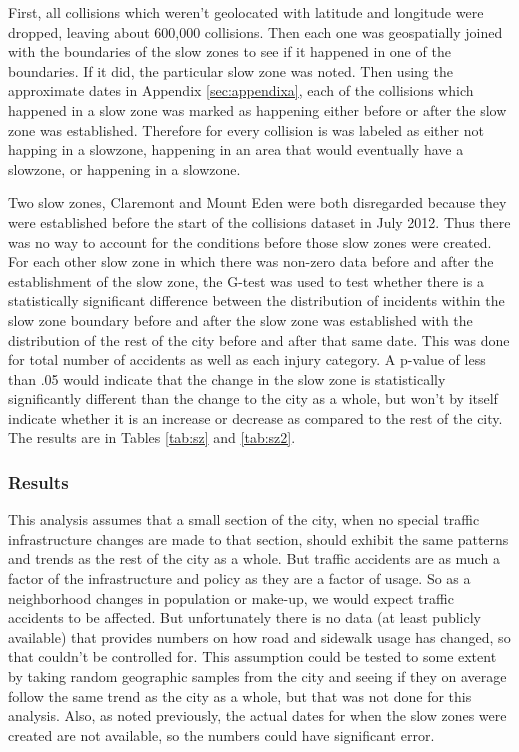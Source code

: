 \documentclass[10pt,journal,compsoc]{IEEEtran}
\begin{document}
First, all collisions which weren't geolocated with latitude and longitude were dropped, leaving about 600,000 collisions.  Then each one was geospatially joined with the boundaries of the slow zones to see if it happened in one of the boundaries.  If it did, the particular slow zone  was noted.  Then using the approximate dates in Appendix \ref{sec:appendixa}, each of the collisions which happened in a slow zone  was marked as happening either before or after the slow zone  was established.  Therefore for every collision is was labeled as either not happing in a slowzone, happening in an area that would eventually have a slowzone, or happening in a slowzone.

Two slow zones, Claremont and Mount Eden were both disregarded because they were established before the start of the collisions dataset in July 2012.  Thus there was no way to account for the conditions before those slow zones were created.  For each other slow zone in which there was non-zero data before and after the establishment of the slow zone, the G-test was used to test whether there is a statistically significant difference between the distribution of incidents within the slow zone boundary before and after the slow zone was established with the distribution of the rest of the city before and after that same date.  This was done for total number of accidents as well as each injury category.  A p-value of less than .05 would indicate that the change in the slow zone is statistically significantly different than the change to the city as a whole, but won't by itself indicate whether it is an increase or decrease as compared to the rest of the city.  The results are in Tables \ref{tab:sz} and \ref{tab:sz2}.

\subsubsection{Results}


This analysis assumes that a small section of the city, when no special traffic infrastructure changes are made to that section, should exhibit the same patterns and trends as the rest of the city as a whole.  But traffic accidents are as much a factor of the infrastructure and policy as they are a factor of usage.  So as a neighborhood changes in population or make-up, we would expect traffic accidents to be affected.  But unfortunately there is no data (at least publicly available) that provides numbers on how road and sidewalk usage has changed, so that couldn't be controlled for.  This assumption could be tested to some extent by taking random geographic samples from the city and seeing if they on average follow the same trend as the city as a whole, but that was not done for this analysis.  Also, as noted previously, the actual dates for when the slow zones were created are not available, so the numbers could have significant error.
\end{document}
